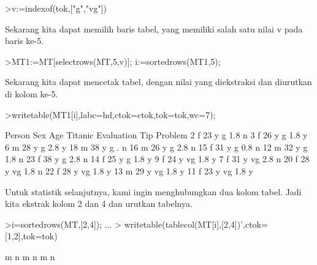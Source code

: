 \documentclass[a4paper,10pt]{article}
\begin{document}
\begin{eulernotebook}
\begin{eulercomment}
\begin{eulercomment}
\begin{eulerprompt}
>v:=indexof(tok,["g","vg"])
\end{eulerprompt}
\begin{euleroutput}
  [5,  6]
\end{euleroutput}
\begin{eulercomment}
Sekarang kita dapat memilih baris tabel, yang memiliki salah satu
nilai v pada baris ke-5.
\end{eulercomment}
\begin{eulerprompt}
>MT1:=MT[selectrows(MT,5,v)]; i:=sortedrows(MT1,5);
\end{eulerprompt}
\begin{eulercomment}
Sekarang kita dapat mencetak tabel, dengan nilai yang diekstraksi dan
diurutkan di kolom ke-5.
\end{eulercomment}
\begin{eulerprompt}
>writetable(MT1[i],labc=hd,ctok=ctok,tok=tok,wc=7);
\end{eulerprompt}
\begin{euleroutput}
   Person    Sex    Age Titanic Evaluation    Tip Problem
        2      f     23       y          g    1.8       n
        3      f     26       y          g    1.8       y
        6      m     28       y          g    2.8       y
       18      m     38       y          g      .       n
       16      m     26       y          g    2.8       n
       15      f     31       y          g    0.8       n
       12      m     32       y          g    1.8       n
       23      f     38       y          g    2.8       n
       14      f     25       y          g    1.8       y
        9      f     24       y         vg    1.8       y
        7      f     31       y         vg    2.8       n
       20      f     28       y         vg    1.8       n
       22      f     28       y         vg    1.8       y
       13      m     29       y         vg    1.8       y
       11      f     23       y         vg    1.8       y
\end{euleroutput}
\begin{eulercomment}
Untuk statistik selanjutnya, kami ingin menghubungkan dua kolom tabel.
Jadi kita ekstrak kolom 2 dan 4 dan urutkan tabelnya.
\end{eulercomment}
\begin{eulerprompt}
>i=sortedrows(MT,[2,4]);  ...
>  writetable(tablecol(MT[i],[2,4])',ctok=[1,2],tok=tok)
\end{eulerprompt}
\begin{euleroutput}
           m         n
           m         n
           m         n

\end{euleroutput}
\end{eulercomment}
\end{eulercomment}
\end{eulernotebook}
\end{document}
